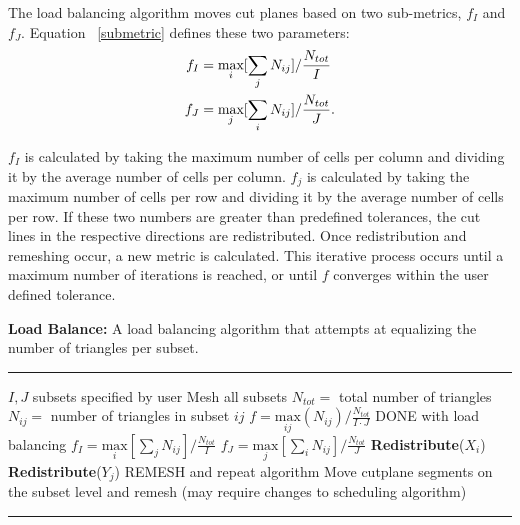 The load balancing algorithm moves cut planes based on two sub-metrics, $f_I$ and $f_J$. Equation ~\eqref{submetric} defines these two parameters:
\begin{align}
f_I &= \underset{i}{\text{max}}[\sum_{j} N_{ij}]/\frac{N_{tot}}{I} \notag \\
f_J &= \underset{j}{\text{max}}[\sum_{i} N_{ij}]/\frac{N_{tot}}{J}.
\label{submetric}
\end{align}

$f_I$ is calculated by taking the maximum number of cells per column and dividing it by the average number of cells per column. $f_j$ is calculated by taking the maximum number of cells per row and dividing it by the average number of cells per row. If these two numbers are greater than predefined tolerances, the cut lines in the respective directions are redistributed. Once redistribution and remeshing occur, a new metric is calculated. This iterative process occurs until a maximum number of iterations is reached, or until $f$ converges within the user defined tolerance.

\noindent\begin{minipage}{\textwidth}
\textbf{Load Balance:} A load balancing algorithm that attempts at equalizing the number of triangles per subset. \\
\rule{\textwidth}{0.4pt}
\begin{algorithmic}
\STATE  $I,J$ subsets specified by user
\STATE Mesh all subsets
\STATE  $N_{tot} = $ total number of triangles
\STATE  $N_{ij} = $ number of triangles in subset $ij$
\STATE $f =\underset{ij}{\text{max}}(N_{ij})/\frac{N_{tot}}{I\cdot J}$
	\STATE DONE with load balancing
\ELSE
	\STATE $f_I = \underset{i}{\text{max}}[\sum_{j} N_{ij}]/\frac{N_{tot}}{I}$
	\STATE $f_J = \underset{j}{\text{max}}[\sum_{i} N_{ij}]/\frac{N_{tot}}{J}$
		\STATE \textbf{Redistribute}($X_i$)
	\ENDIF
		\STATE \textbf{Redistribute}($Y_j$)
	\ENDIF 
		\STATE REMESH and repeat algorithm
	\ENDIF
\ENDIF
{}
     \STATE Move cutplane segments on the subset level and remesh (may require changes to scheduling algorithm)
\ENDIF
\end{algorithmic}
\rule{\textwidth}{0.4pt}
\end{minipage}

\bigskip

